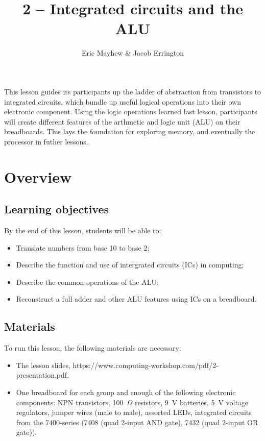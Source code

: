\documentclass[11pt]{article}
\title{2 -- Integrated circuits and the ALU}
\author{Eric Mayhew \& Jacob Errington}
\date{}
\newcommand{\cwurl}{https://www.computing-workshop.com/}
\newcommand{\cwpdf}{\cwurl pdf/}
\begin{document}
\maketitle

This lesson guides its participants up the ladder of abstraction from
transistors to integrated circuits, which bundle up useful logical operations
into their own electronic component. Using the logic operations learned last
lesson, participants will create different features of the arthmetic and logic unit (ALU)
on their breadboards. This lays the foundation for exploring memory, and
eventually the processor in futher lessons.

\section*{Overview}

\subsection*{Learning objectives}

By the end of this lesson, students will be able to:
%
\begin{itemize}
\item Translate numbers from base 10 to base 2;
  \item Describe the function and use of intergrated circuits (ICs) in computing;
\item Describe the common operations of the ALU;
  \item Reconstruct a full adder and other ALU features using ICs on a breadboard.
\end{itemize}

\subsection*{Materials}

To run this lesson, the following materials are necessary:

\begin{itemize}
\item The lesson slides, \cwpdf{2-presentation.pdf}.
\item One breadboard for each group and enough of the following electronic
  components:
  NPN transistors,
  100~$\Omega$ resistors,
  9~V batteries,
  5~V voltage regulators,
  jumper wires (male to male),
  assorted LEDs,
  integrated circuits from the 7400-series (7408 (quad 2-input AND gate), 7432
  (quad 2-input OR gate)).
\end{itemize}
\end{document}
